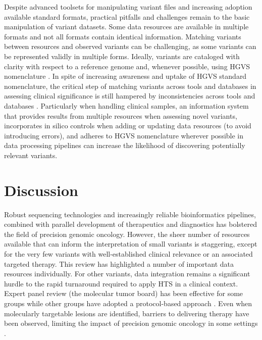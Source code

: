 \documentclass{article}
\begin{document}
Despite advanced toolsets for manipulating variant files and
increasing adoption available standard formats, practical pitfalls and
challenges remain to the basic manipulation of variant datasets. Some
data resources are available in multiple formats and not all formats
contain identical information. Matching variants between resources and
observed variants can be challenging, as some variants can be
represented validly in multiple forms. Ideally, variants are cataloged
with clarity with respect to a reference genome and, whenever
possible, using HGVS nomenclature \cite{Den_Dunnen2016-gw}. In spite
of increasing awareness and uptake of HGVS standard nomenclature, the
critical step of matching variants across tools and databases in
assessing clinical significance is still hampered by inconsistencies
across tools and databases \cite{Yen2017-lq}. Particularly when
handling clinical samples, an information system that provides results
from multiple resources when assessing novel variants, incorporates in
silico controls when adding or updating data resources (to avoid
introducing errors), and adheres to HGVS nomenclature wherever
possible in data processing pipelines can increase the likelihood of
discovering potentially relevant variants.

\section{Discussion}

Robust sequencing technologies and increasingly reliable
bioinformatics pipelines, combined with parallel development of
therapeutics and diagnostics has bolstered the field of precision
genomic oncology. However, the sheer number of resources available
that can inform the interpretation of small variants is staggering,
except for the very few variants with well-established clinical
relevance or an associated targeted therapy. This review has
highlighted a number of important data resources individually. For
other variants, data integration remains a significant hurdle to the
rapid turnaround required to apply HTS in a clinical context. Expert
panel review (the molecular tumor board) has been effective for some
groups \cite{Knepper2017-no,Beltran2015-pz,Sohal2015-bi} while other
groups have adopted a protocol-based approach
\cite{Ghazani2017-oo}. Even when molecularly targetable lesions are
identified, barriers to delivering therapy have been observed,
limiting the impact of precision genomic oncology in some settings
\cite{Bryce2017-ht}.
\end{document}
